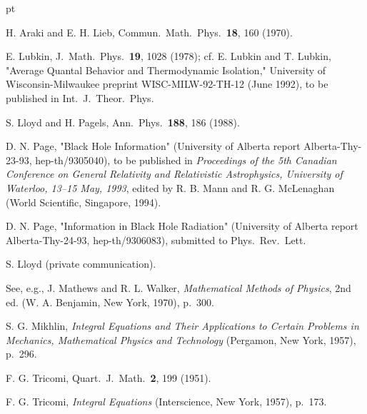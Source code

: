\documentclass[12pt]{article}
\begin{document}
   pt
\pagebreak
	\begin{thebibliography}{99}
 H. Araki and E. H. Lieb, Commun.\ Math.\ Phys.\ {\bf 18},
160
(1970).

 E. Lubkin, J.\ Math.\ Phys.\ {\bf 19}, 1028 (1978); cf.
E. Lubkin
and T. Lubkin, "Average Quantal Behavior and Thermodynamic
Isolation,"
University of Wisconsin-Milwaukee preprint WISC-MILW-92-TH-12 (June
1992), to
be published in Int.\ J.\ Theor.\ Phys.

 S. Lloyd and H. Pagels, Ann.\ Phys.\ {\bf 188}, 186
(1988).

 D. N. Page, "Black Hole Information" (University of
Alberta report
Alberta-Thy-23-93, hep-th/9305040), to be published in {\em
Proceedings of the
5th Canadian Conference on General Relativity and Relativistic
Astrophysics,
University of Waterloo, 13--15 May, 1993}, edited by R. B. Mann and
R. G. McLenaghan (World Scientific, Singapore, 1994).

 D. N. Page, "Information in Black Hole Radiation"
(University of
Alberta report Alberta-Thy-24-93, hep-th/9306083), submitted to
Phys.\ Rev.\
Lett.

 S. Lloyd (private communication).

 See, e.g., J. Mathews and R. L. Walker, {\em
Mathematical Methods
of Physics}, 2nd ed. (W. A. Benjamin, New York, 1970), p.~300.

 S. G. Mikhlin, {\em Integral Equations and Their
Applications to
Certain Problems in Mechanics, Mathematical Physics and Technology}
(Pergamon,
New York, 1957), p.~296.

 F. G. Tricomi, Quart.\ J.\ Math.\ {\bf 2}, 199 (1951).

 F. G. Tricomi, {\em Integral Equations} (Interscience,
New York,
1957), p.~173.

	\end{thebibliography}
\end{document}
